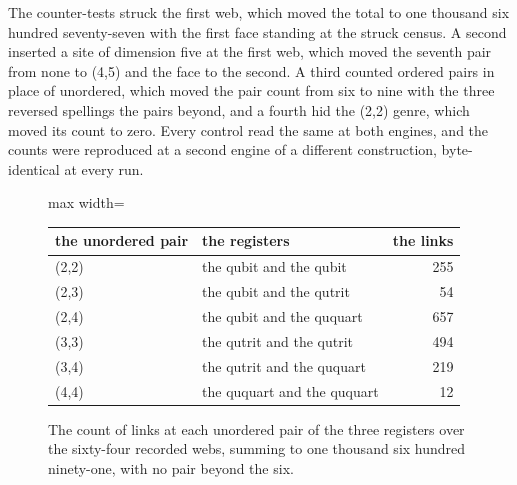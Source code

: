 \begin{chproof}
The counter-tests struck the first web, which moved the total to one thousand six hundred seventy-seven with the first face standing at the struck census. A second inserted a site of dimension five at the first web, which moved the seventh pair from none to (4,5) and the face to the second. A third counted ordered pairs in place of unordered, which moved the pair count from six to nine with the three reversed spellings the pairs beyond, and a fourth hid the (2,2) genre, which moved its count to zero. Every control read the same at both engines, and the counts were reproduced at a second engine of a different construction, byte-identical at every run.
\end{chproof}
\begin{figure}[h]\centering
\begin{adjustbox}{max width=\linewidth}\begin{tabular}{llr}\toprule
the unordered pair & the registers & the links \\ \midrule
(2,2) & the qubit and the qubit & 255 \\
(2,3) & the qubit and the qutrit & 54 \\
(2,4) & the qubit and the ququart & 657 \\
(3,3) & the qutrit and the qutrit & 494 \\
(3,4) & the qutrit and the ququart & 219 \\
(4,4) & the ququart and the ququart & 12 \\ \bottomrule
\end{tabular}\end{adjustbox}
\caption{The count of links at each unordered pair of the three registers over the sixty-four recorded webs, summing to one thousand six hundred ninety-one, with no pair beyond the six.}
\end{figure}

